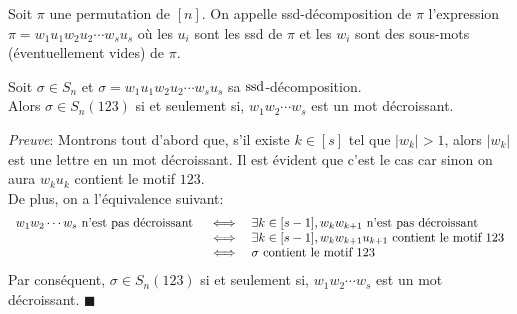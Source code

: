 \begin{definition}
	\begin{rm}
		Soit $\pi$ une permutation de $[n]$. On appelle ssd-décomposition de $\pi$ l'expression $\pi = w_{1}u_{1}w_{2}u_2 \cdots w_{s}u_{s}$ où les $u_{i}$ sont les ssd de $\pi$ et les $w_{i}$ sont des sous-mots (éventuellement vides)  de $\pi$.
	\end{rm}
\end{definition}
\begin{lemme}
	Soit $\sigma \in S_{n}$ et $\sigma = w_{1}u_{1}w_{2}u_2 \cdots w_{s}u_{s}$ sa $\rm{ssd}$-décomposition. \\
	Alors $\sigma \in S_{n}(123)$ si et seulement si, $w_{1}w_{2}\cdots w_{s}$ est un mot décroissant.
\end{lemme}
\textit{Preuve}:
Montrons tout d'abord que, s'il existe $k\in [s]$ tel que $|w_{k}|>1$, alors $|w_{k}|$ est une lettre en un mot décroissant. Il est évident que c'est le cas car sinon on aura $w_{k}u_{k}$ contient le motif $123$.\\
De plus, on a l'équivalence suivant:
\[
	\begin{array} {l l l}
		w_{1}w_{2}\cdots w_{s} \text{ n'est pas décroissant } & \iff & \exists k \in [s - 1], w_{k} w_{k+1} 
		\text{ n'est pas décroissant }\\
		& \iff & \exists k \in [s - 1], w_{k} w_{k+1} u_{k+1} \text{ contient le motif } 123\\
		& \iff & \sigma \text{ contient le motif } 123\\
	\end{array}
\]
Par conséquent, $\sigma \in S_{n}(123)$ si et seulement si, $w_{1}w_{2}\cdots w_{s}$ est un mot décroissant. $\blacksquare$

